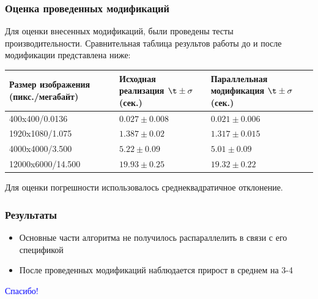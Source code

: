 \documentclass{beamer}
\begin{document}
\begin{frame}\frametitle{Оценка проведенных модификаций}
    Для оценки внесенных модификаций, были проведены тесты производительности.
    Сравнительная таблица результов работы до и после модификации представлена ниже:
    \begin{center}
        \begin{tabular}{ | p{4cm} | p{3cm} | p{3cm}|}
        \hline
        Размер изображения (пикс./мегабайт) & Исходная реализация $\t\pm\sigma$ (сек.) & Параллельная модификация $\t\pm\sigma$ (сек.) \\ \hline
        400x400/0.0136 & $0.027\pm0.008$ & $0.021\pm0.006$ \\ \hline
        1920x1080/1.075 & $1.387\pm0.02$ & $1.317\pm0.015$ \\ \hline
        4000x4000/3.500 & $5.22\pm0.09$ & $5.01\pm0.09$ \\ \hline
        12000x6000/14.500 & $19.93\pm0.25$ & $19.32\pm0.22$ \\ \hline
        \end{tabular}
    \end{center}
    Для оценки погрешности использовалось среднеквадратичное отклонение.
\end{frame}


\begin{frame}\frametitle{Результаты}
\begin{itemize}
    \item{Основные части алгоритма не получилось распараллелить в связи с его спецификой}
    \item{После проведенных модификаций наблюдается прирост в среднем на 3-4 %
}
\end{itemize}
\end{frame}


\begin{frame}[c]
\begin{center}
{\Large \textcolor{blue}{Спасибо!}}
\end{center}
\end{frame}
    
\end{document}
